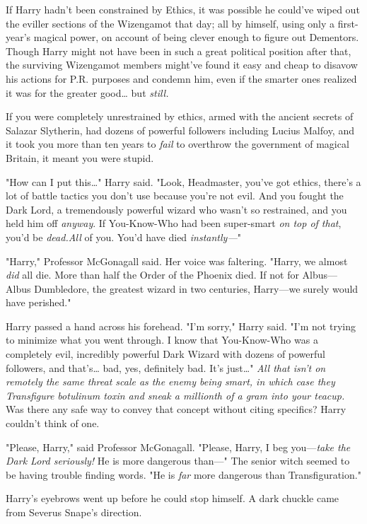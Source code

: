 If Harry hadn't been constrained by Ethics, it was possible he could've wiped out the eviller sections of the Wizengamot that day; all by himself, using only a first-year's magical power, on account of being clever enough to figure out Dementors. Though Harry might not have been in such a great political position after that, the surviving Wizengamot members might've found it easy and cheap to disavow his actions for P.R. purposes and condemn him, even if the smarter ones realized it was for the greater good{\ldots} but \emph{still.}

If you were completely unrestrained by ethics, armed with the ancient secrets of Salazar Slytherin, had dozens of powerful followers including Lucius Malfoy, and it took you more than ten years to \emph{fail} to overthrow the government of magical Britain, it meant you were stupid.

"How can I put this{\ldots}" Harry said. "Look, Headmaster, you've got ethics, there's a lot of battle tactics you don't use because you're not evil. And you fought the Dark Lord, a tremendously powerful wizard who wasn't so restrained, and you held him off \emph{anyway}. If You-Know-Who had been super-smart \emph{on top of that}, you'd be \emph{dead.All} of you. You'd have died \emph{instantly---}"

"Harry," Professor McGonagall said. Her voice was faltering. "Harry, we almost \emph{did} all die. More than half the Order of the Phoenix died. If not for Albus---Albus Dumbledore, the greatest wizard in two centuries, Harry---we surely would have perished."

Harry passed a hand across his forehead. "I'm sorry," Harry said. "I'm not trying to minimize what you went through. I know that You-Know-Who was a completely evil, incredibly powerful Dark Wizard with dozens of powerful followers, and that's{\ldots} bad, yes, definitely bad. It's just{\ldots}" \emph{All that isn't on remotely the same threat scale as the enemy being smart, in which case they Transfigure botulinum toxin and sneak a millionth of a gram into your teacup.} Was there any safe way to convey that concept without citing specifics? Harry couldn't think of one.

"Please, Harry," said Professor McGonagall. "Please, Harry, I beg you---\emph{take the Dark Lord seriously!} He is more dangerous than---" The senior witch seemed to be having trouble finding words. "He is \emph{far} more dangerous than Transfiguration."

Harry's eyebrows went up before he could stop himself. A dark chuckle came from Severus Snape's direction.

